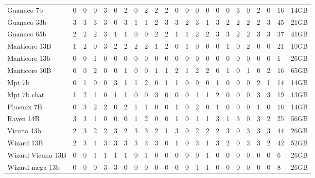 \begin{table}[!htbp]
\begin{tabular}{l|rrrrrrrrrrrrrrrrrrrr}
            Guanaco 7b & 0 & 0 & 0 & 3 & 0 & 2 & 0 & 2 & 2 & 2 & 0 & 0 & 0 & 0 & 0 & 0 & 3 & 0 & 2 & 0 & 16 & 14GB \\
            Guanaco 33b & 3 & 3 & 3 & 3 & 0 & 3 & 1 & 1 & 2 & 3 & 3 & 2 & 3 & 1 & 3 & 2 & 2 & 2 & 2 & 3 & 45 & 21GB \\
            Guanaco 65b & 2 & 2 & 2 & 3 & 1 & 1 & 0 & 0 & 2 & 2 & 1 & 1 & 2 & 2 & 3 & 3 & 2 & 2 & 3 & 3 & 37 & 41GB \\
            Manticore 13B & 1 & 2 & 0 & 3 & 2 & 2 & 2 & 2 & 1 & 2 & 0 & 1 & 0 & 0 & 0 & 1 & 0 & 2 & 0 & 0 & 21 & 10GB \\
            Manticore 13b & 0 & 0 & 1 & 0 & 0 & 0 & 0 & 0 & 0 & 0 & 0 & 0 & 0 & 0 & 0 & 0 & 0 & 0 & 0 & 0 & 1 & 26GB \\
            Manticore 30B & 0 & 0 & 2 & 0 & 0 & 1 & 0 & 0 & 1 & 1 & 2 & 1 & 2 & 2 & 0 & 1 & 0 & 1 & 0 & 2 & 16 & 65GB \\
            Mpt 7b & 0 & 1 & 0 & 0 & 3 & 1 & 1 & 2 & 0 & 1 & 1 & 0 & 0 & 0 & 1 & 0 & 0 & 0 & 2 & 1 & 14 & 14GB \\
            Mpt 7b chat & 1 & 2 & 1 & 0 & 1 & 1 & 0 & 0 & 3 & 0 & 0 & 0 & 1 & 1 & 2 & 0 & 0 & 0 & 3 & 3 & 19 & 13GB \\
            Phoenix 7B & 0 & 3 & 2 & 2 & 0 & 2 & 1 & 1 & 0 & 0 & 1 & 0 & 2 & 0 & 1 & 0 & 0 & 0 & 1 & 0 & 16 & 14GB \\
            Raven 14B & 3 & 3 & 1 & 0 & 0 & 0 & 1 & 2 & 0 & 0 & 1 & 0 & 1 & 1 & 3 & 1 & 3 & 0 & 3 & 2 & 25 & 56GB \\
            Vicuna 13b & 2 & 3 & 2 & 2 & 3 & 2 & 3 & 3 & 2 & 1 & 3 & 0 & 2 & 2 & 2 & 3 & 0 & 3 & 3 & 3 & 44 & 26GB \\
            Wizard 13B & 2 & 3 & 1 & 3 & 3 & 3 & 3 & 3 & 3 & 0 & 1 & 0 & 3 & 1 & 3 & 2 & 0 & 3 & 3 & 2 & 42 & 52GB \\
            Wizard Vicuna 13B & 0 & 0 & 1 & 1 & 1 & 1 & 0 & 1 & 0 & 0 & 0 & 0 & 0 & 1 & 0 & 0 & 0 & 0 & 0 & 0 & 6 & 26GB \\
            Wizard mega 13b & 0 & 0 & 0 & 3 & 3 & 0 & 0 & 0 & 0 & 0 & 0 & 0 & 1 & 1 & 0 & 0 & 0 & 0 & 0 & 0 & 8 & 26GB \\
            \bottomrule
        \end{tabular}
\end{table}
